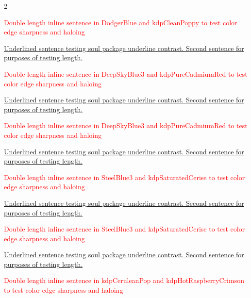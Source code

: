 \begin{multicols}{2}
\par\noindent\textcolor{Red}{Double length inline sentence in DodgerBlue and kdpCleanPoppy to test color edge sharpness and haloing}
\clearpage
{}
\par\noindent\ul{Underlined sentence testing soul package underline contrast. Second sentence for purposes of testing length.}
\par\noindent\textcolor{Red}{Double length inline sentence in DeepSkyBlue3 and kdpPureCadmiumRed to test color edge sharpness and haloing}
\clearpage
{}
\par\noindent\ul{Underlined sentence testing soul package underline contrast. Second sentence for purposes of testing length.}
\par\noindent\textcolor{Red}{Double length inline sentence in DeepSkyBlue3 and kdpPureCadmiumRed to test color edge sharpness and haloing}
\clearpage
{}
\par\noindent\ul{Underlined sentence testing soul package underline contrast. Second sentence for purposes of testing length.}
\par\noindent\textcolor{Red}{Double length inline sentence in SteelBlue3 and kdpSaturatedCerise to test color edge sharpness and haloing}
\clearpage
{}
\par\noindent\ul{Underlined sentence testing soul package underline contrast. Second sentence for purposes of testing length.}
\par\noindent\textcolor{Red}{Double length inline sentence in SteelBlue3 and kdpSaturatedCerise to test color edge sharpness and haloing}
\clearpage
{}
\par\noindent\ul{Underlined sentence testing soul package underline contrast. Second sentence for purposes of testing length.}
\par\noindent\textcolor{Red}{Double length inline sentence in kdpCeruleanPop and kdpHotRaspberryCrimson to test color edge sharpness and haloing}
\clearpage
{}

\end{multicols}
